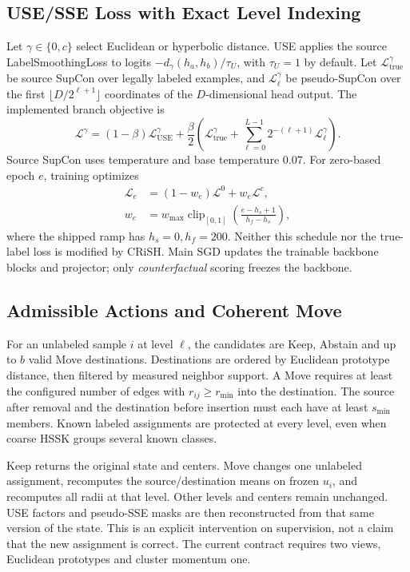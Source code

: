 \documentclass[conference]{IEEEtran}
\newcommand{\Lcal}{\mathcal L}
\begin{document}
\subsection{USE/SSE Loss with Exact Level Indexing}
Let $\gamma\in\{0,c\}$ select Euclidean or hyperbolic distance. USE applies the source LabelSmoothingLoss to logits $-d_\gamma(h_a,h_b)/\tau_U$, with $\tau_U=1$ by default. Let $\Lcal_{\mathrm{true}}^\gamma$ be source SupCon over legally labeled examples, and $\Lcal_{\ell}^\gamma$ be pseudo-SupCon over the first $\lfloor D/2^{\ell+1}\rfloor$ coordinates of the $D$-dimensional head output. The implemented branch objective is
\begin{equation}\label{eq:branch}
\Lcal^\gamma=(1-\beta)\Lcal_{\mathrm{USE}}^\gamma+
\frac\beta2\left(\Lcal_{\mathrm{true}}^\gamma+
\sum_{\ell=0}^{L-1}2^{-(\ell+1)}\Lcal_\ell^\gamma\right).
\end{equation}
Source SupCon uses temperature and base temperature $0.07$. For zero-based epoch $e$, training optimizes
\begin{align}
\Lcal_e&=(1-w_e)\Lcal^0+w_e\Lcal^c,\\
w_e&=w_{\max}\operatorname{clip}_{[0,1]}
\left(\frac{e-h_s+1}{h_f-h_s}\right),
\end{align}
where the shipped ramp has $h_s=0,h_f=200$. Neither this schedule nor the true-label loss is modified by CRiSH. Main SGD updates the trainable backbone blocks and projector; only \emph{counterfactual} scoring freezes the backbone.

\subsection{Admissible Actions and Coherent Move}
For an unlabeled sample $i$ at level $\ell$, the candidates are Keep, Abstain and up to $b$ valid Move destinations. Destinations are ordered by Euclidean prototype distance, then filtered by measured neighbor support. A Move requires at least the configured number of edges with $r_{ij}\ge r_{\min}$ into the destination. The source after removal and the destination before insertion must each have at least $s_{\min}$ members. Known labeled assignments are protected at every level, even when coarse HSSK groups several known classes.

Keep returns the original state and centers. Move changes one unlabeled assignment, recomputes the source/destination means on frozen $u_i$, and recomputes all radii at that level. Other levels and centers remain unchanged. USE factors and pseudo-SSE masks are then reconstructed from that same version of the state. This is an explicit intervention on supervision, not a claim that the new assignment is correct. The current contract requires two views, Euclidean prototypes and cluster momentum one.
\end{document}
